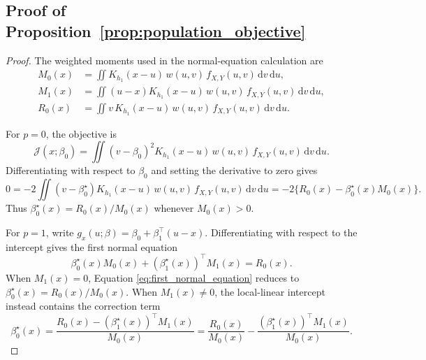\documentclass[preprint,1p,times,authoryear]{elsarticle}
\begin{document}
\subsection{Proof of Proposition~\ref{prop:population_objective}}
\label{appendix:proof_population_objective}
\begin{proof}
The weighted moments used in the normal-equation calculation are
\begin{align}
M_0(x)
&=\iint
K_{h_1}(x-u)\,
w(u,v)\,
f_{X,Y}(u,v)\,\mathrm d v\,\mathrm d u, \label{eq:proof_M0}\\
M_1(x)
&=\iint
(u-x)K_{h_1}(x-u)\,
w(u,v)\,
f_{X,Y}(u,v)\,\mathrm d v\,\mathrm d u, \label{eq:M1_centering}\\
R_0(x)
&=\iint v\,
K_{h_1}(x-u)\,
w(u,v)\,
f_{X,Y}(u,v)\,\mathrm d v\,\mathrm d u. \label{eq:proof_R0}
\end{align}

For $p=0$, the objective is
\[
\mathcal J(x;\beta_0)
=\iint
(v-\beta_0)^2
K_{h_1}(x-u)\,
w(u,v)\,
f_{X,Y}(u,v)\,\mathrm d v\,\mathrm d u.
\]
Differentiating with respect to $\beta_0$ and setting the derivative to zero gives
\[
0
=-2\iint
(v-\beta_0^\star)
K_{h_1}(x-u)\,
w(u,v)\,
f_{X,Y}(u,v)\,\mathrm d v\,\mathrm d u
=-2\{R_0(x)-\beta_0^\star(x)M_0(x)\}.
\]
Thus $\beta_0^\star(x)=R_0(x)/M_0(x)$ whenever $M_0(x)>0$.

For $p=1$, write $g_x(u;\beta)=\beta_0+\beta_1^\top(u-x)$. Differentiating with respect to the intercept gives the first normal equation
\begin{equation}
\beta_0^\star(x)M_0(x)+(\beta_1^\star(x))^\top M_1(x)=R_0(x). \label{eq:first_normal_equation}
\end{equation}
When $M_1(x)=0$, Equation \eqref{eq:first_normal_equation} reduces to $\beta_0^\star(x)=R_0(x)/M_0(x)$. When $M_1(x)\neq0$, the local-linear intercept instead contains the correction term
\[
\beta_0^\star(x)
=\frac{R_0(x)-(\beta_1^\star(x))^\top M_1(x)}{M_0(x)}
=\frac{R_0(x)}{M_0(x)}
-\frac{(\beta_1^\star(x))^\top M_1(x)}{M_0(x)}.
\]
\end{proof}
\end{document}
